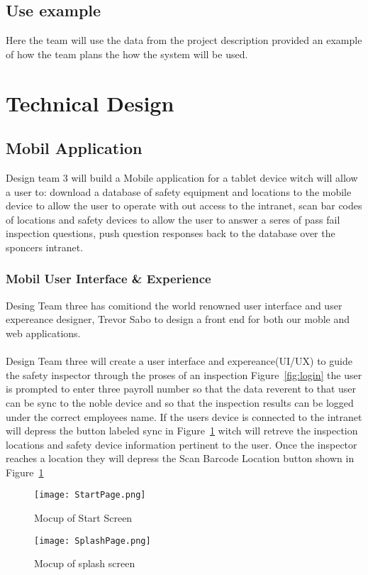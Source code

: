 \documentclass[Letter,11pt]{article}
\begin{document}
	\subsection{Use example}
		Here the team will use the data from the project description provided an example of how the team plans the how the system will be used.
		  
		
\section{Technical Design}
	
	\subsection{Mobil Application}
	Design team 3 will build a Mobile application for a tablet device witch will allow a user to: download a database of safety equipment and locations to the mobile device to allow the user to operate with out access to the intranet, scan bar codes of locations and safety devices to allow the user to answer a seres of pass fail inspection questions, push question responses back to the database over the sponcers intranet.
	\subsubsection{Mobil User Interface \& Experience}
	Desing Team three has comitiond the world renowned user interface and user expereance designer, Trevor Sabo to design a front end for both our moble and web applications.\\
	\\
	Design Team three will create a user interface and expereance(UI/UX) to guide the safety inspector through the proses of an inspection Figure~\ref{fig:login} the user is prompted to enter three payroll number so that the data reverent to that user can be sync to the noble device and so that the inspection results can be logged under the correct employees name.
	If the users device is connected to the intranet will depress the button labeled sync in Figure~\ref{fig:splash} witch will retreve the inspection locations and safety device information pertinent to the user.
	Once the inspector reaches a location they will depress the Scan Barcode Location button shown in Figure~\ref{fig:splash}
	\begin{figure}[h]
		
		\begin{minipage}{0.5\textwidth}
			\centering
			\texttt{[image: StartPage.png]}
			\caption{\label{fig:login}Mocup of Start Screen}
		\end{minipage}%
		\begin{minipage}{0.5\textwidth}
			\centering
			\texttt{[image: SplashPage.png]}
			\caption{\label{fig:splash}Mocup of splash screen}
		\end{minipage}
	\end{figure}
	
\end{document}
